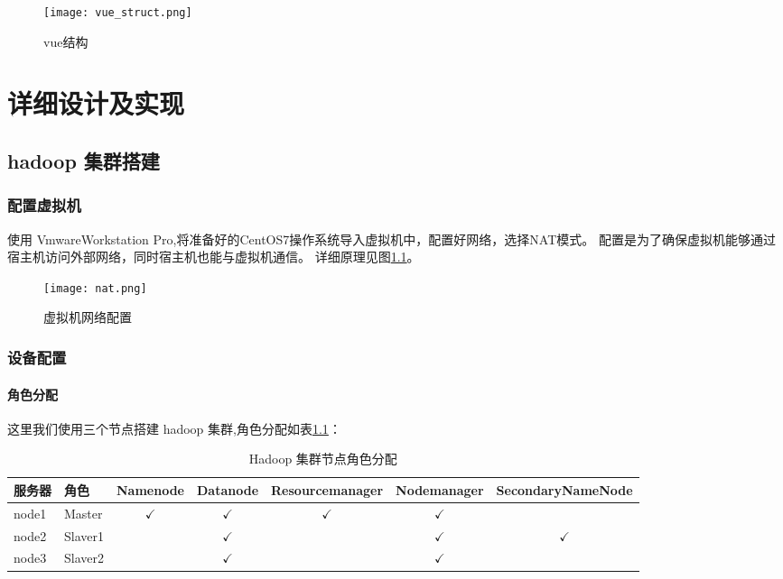 \documentclass[bachelor]{thesis-uestc}
\begin{document}
\begin{figure}[htbp]
    \centering
    \texttt{[image: vue\_struct.png]}
    \caption{vue结构}
    \label{vue_struct}
\end{figure}


\chapter{详细设计及实现}

\section{hadoop 集群搭建}
\subsection{配置虚拟机}
使用 VmwareWorkstation Pro,将准备好的CentOS7操作系统导入虚拟机中，配置好网络，选择NAT模式。
配置是为了确保虚拟机能够通过宿主机访问外部网络，同时宿主机也能与虚拟机通信。
详细原理见图\ref{nat}。
\begin{figure}[htbp]
    \centering
    \texttt{[image: nat.png]}
    \caption{虚拟机网络配置}
    \label{nat}
\end{figure}
\subsection{设备配置}
\subsubsection{角色分配}
这里我们使用三个节点搭建 hadoop 集群,角色分配如表\ref{node_tables}：\\ 
\begin{table}[ht]
\centering

\begin{tabular}{|l|l|c|c|c|c|c|}
\hline
服务器 & 角色 & Namenode & Datanode & Resourcemanager & Nodemanager & SecondaryNameNode \\
\hline
node1 & Master & $\checkmark$ & $\checkmark$ & $\checkmark$ & $\checkmark$ & \\
\hline
node2 & Slaver1 &  & $\checkmark$ &  & $\checkmark$ & $\checkmark$ \\
\hline
node3 & Slaver2 &  & $\checkmark$ &  & $\checkmark$ & \\
\hline
\end{tabular}

\caption{Hadoop 集群节点角色分配}
\label{node_tables}
\end{table}
\end{document}
